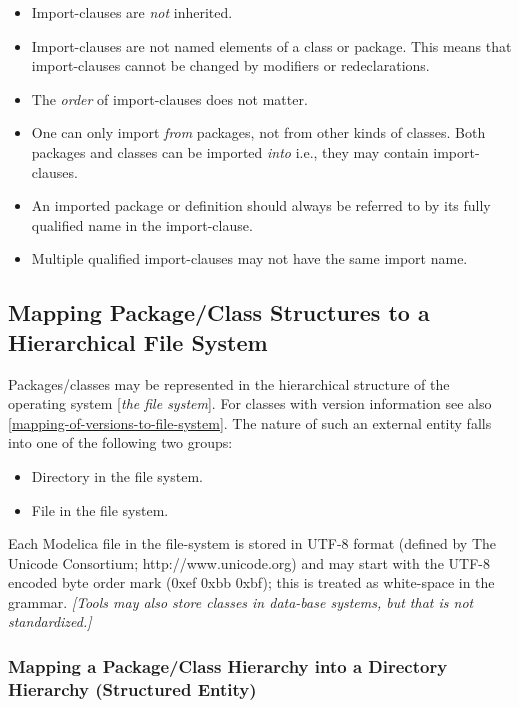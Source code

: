 \documentclass[../MLS.tex]{subfiles}
\begin{document}
\begin{itemize}
\item
  Import-clauses are \emph{not} inherited.
\item
  Import-clauses are not named elements of a class or package. This
  means that import-clauses cannot be changed by modifiers or
  redeclarations.
\item
  The \emph{order} of import-clauses does not matter.
\item
  One can only import \emph{from} packages, not from other kinds of
  classes. Both packages and classes can be imported \emph{into} i.e.,
  they may contain import-clauses.
\item
  An imported package or definition should always be referred to by its
  fully qualified name in the import-clause.
\item
  Multiple qualified import-clauses may not have the same import name.
\end{itemize}

\subsection{Mapping Package/Class Structures to a Hierarchical File System}

Packages/classes may be represented in the hierarchical structure of the
operating system {[}\emph{the file system}{]}. For classes with version
information see also \autoref{mapping-of-versions-to-file-system}. The nature of such an external
entity falls into one of the following two groups:

\begin{itemize}
\item
  Directory in the file system.
\end{itemize}

\begin{itemize}
\item
  File in the file system.
\end{itemize}

Each Modelica file in the file-system is stored in UTF-8 format (defined
by The Unicode Consortium; http://www.unicode.org) and may start with
the UTF-8 encoded byte order mark (0xef 0xbb 0xbf); this is treated as
white-space in the grammar. \emph{{[}Tools may also store classes in
data-base systems, but that is not standardized.{]}}

\subsubsection{Mapping a Package/Class Hierarchy into a Directory Hierarchy (Structured Entity)}
\end{document}
